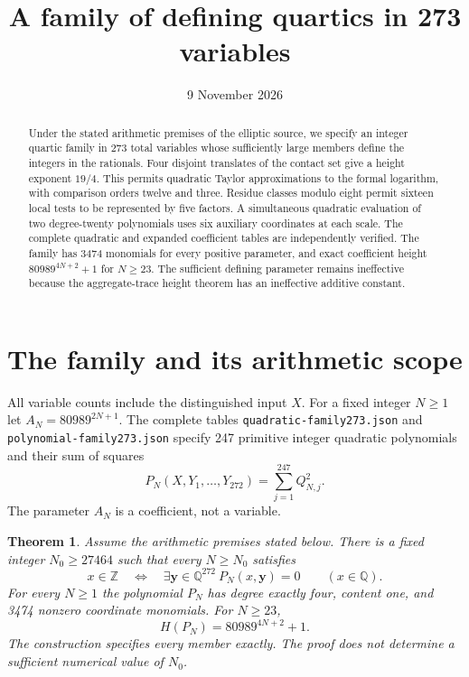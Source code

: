 \documentclass[11pt,a4paper]{article}
\title{A family of defining quartics in 273 variables}
\author{}\date{9 November 2026}
\newtheorem{theorem}{Theorem}[section]\newtheorem{lemma}[theorem]{Lemma}
\newcommand{\Q}{\mathbb Q}\newcommand{\Z}{\mathbb Z}\newcommand{\HH}{\mathcal H}
\begin{document}
\maketitle
\begin{abstract}
Under the stated arithmetic premises of the elliptic source, we specify
an integer quartic family in 273 total variables whose sufficiently
large members define the integers in the rationals. Four disjoint
translates of the contact set give a height exponent $19/4$. This permits
quadratic Taylor approximations to the formal logarithm, with comparison
orders twelve and three. Residue classes modulo eight permit sixteen local tests to be represented
by five factors. A simultaneous quadratic evaluation of two degree-twenty
polynomials uses six auxiliary coordinates at each scale. The complete
quadratic and expanded coefficient tables are independently verified.
The family has 3474 monomials for every positive parameter, and exact
coefficient height $80989^{4N+2}+1$ for $N\ge23$. The sufficient defining
parameter remains ineffective because the aggregate-trace height theorem
has an ineffective additive constant.
\end{abstract}

\section{The family and its arithmetic scope}
All variable counts include the distinguished input $X$. For a fixed
integer $N\ge1$ let $A_N=80989^{2N+1}$. The complete tables
\nolinkurl{quadratic-family273.json} and
\nolinkurl{polynomial-family273.json} specify 247 primitive integer
quadratic polynomials and their sum of squares
\[
 P_N(X,Y_1,\ldots,Y_{272})=\sum_{j=1}^{247}Q_{N,j}^2.
\]
The parameter $A_N$ is a coefficient, not a variable.

\begin{theorem}\label{thm:main}
Assume the arithmetic premises stated below. There is a fixed integer
$N_0\ge27464$ such that every $N\ge N_0$ satisfies
\[
 x\in\Z\quad\Longleftrightarrow\quad
 \exists\mathbf y\in\Q^{272}\ P_N(x,\mathbf y)=0
 \qquad(x\in\Q).
\]
For every $N\ge1$ the polynomial $P_N$ has degree exactly four,
content one, and 3474 nonzero coordinate monomials. For $N\ge23$,
\[
                       H(P_N)=80989^{4N+2}+1.
\]
The construction specifies every member exactly. The proof does not
determine a sufficient numerical value of $N_0$.
\end{theorem}
\end{document}
